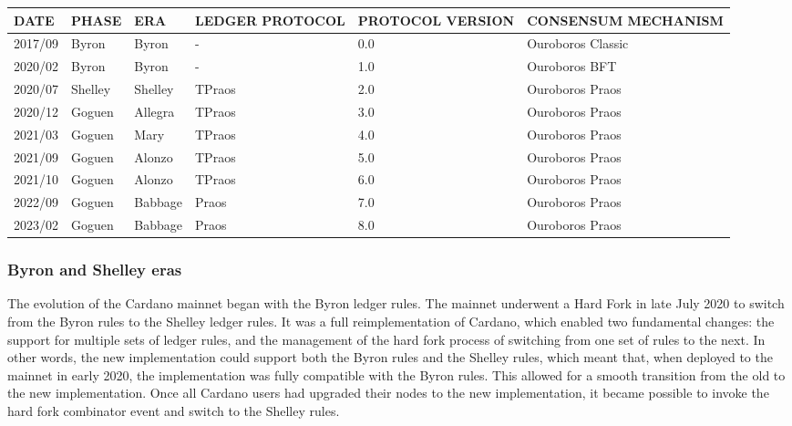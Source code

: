 \begin{tabular}{ ||p{1.25cm}||p{1.5cm}|p{1.5cm}|p{2cm}|p{2cm}|p{3cm}||  }
    \hline
        DATE & PHASE & ERA & LEDGER PROTOCOL & PROTOCOL VERSION & CONSENSUM MECHANISM \\
    \hline\hline
    2017/09 & Byron & Byron & - & 0.0 & Ouroboros Classic \\
    \hline
    2020/02 & Byron & Byron & - & 1.0 & Ouroboros BFT \\
    \hline
    2020/07 & Shelley & Shelley & TPraos & 2.0 & Ouroboros Praos \\
    \hline
    2020/12 & Goguen & Allegra & TPraos & 3.0 & Ouroboros Praos \\
    \hline
    2021/03 & Goguen & Mary & TPraos & 4.0 & Ouroboros Praos \\
    \hline
    2021/09 & Goguen & Alonzo & TPraos & 5.0 & Ouroboros Praos \\
    \hline
    2021/10 & Goguen & Alonzo & TPraos & 6.0 & Ouroboros Praos \\
    \hline
    2022/09 & Goguen & Babbage & Praos & 7.0 & Ouroboros Praos \\
    \hline
    2023/02 & Goguen & Babbage & Praos & 8.0 & Ouroboros Praos \\
    \hline
\end{tabular}

\vspace{0.5cm}

\subsubsection{Byron and Shelley eras}

The evolution of the Cardano mainnet began with the Byron ledger rules. The mainnet 
underwent a \gls{Hard Fork} in late July 2020 to switch from the Byron rules to the Shelley 
ledger rules. It was a full reimplementation of Cardano, which enabled two fundamental 
changes: the support for multiple sets of ledger rules, and the management of the hard 
fork process of switching from one set of rules to the next. In other words, the new 
implementation could support both the Byron rules and the Shelley rules, which meant that, 
when deployed to the mainnet in early 2020, the implementation was fully compatible with 
the Byron rules. This allowed for a smooth transition from the old to the new implementation. 
Once all Cardano users had upgraded their nodes to the new implementation, it became 
possible to invoke the hard fork combinator event and switch to the Shelley rules.

